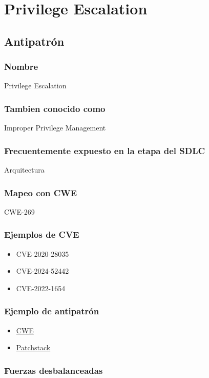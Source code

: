 \chapter{Privilege Escalation}
\section{Antipatrón}
\subsection{Nombre}
Privilege Escalation
\subsection{Tambien conocido como}
Improper Privilege Management
\subsection{Frecuentemente expuesto en la etapa del SDLC}
Arquitectura
\subsection{Mapeo con CWE}
CWE-269
\subsection{Ejemplos de CVE}
\begin{itemize}
    \item CVE-2020-28035
    \item CVE-2024-52442
    \item CVE-2022-1654
\end{itemize}
\subsection{Ejemplo de antipatrón}

\begin{itemize}
    \item \href{https://cwe.mitre.org/data/definitions/269.html}{CWE}
    \item \href{https://patchstack.com/academy/wordpress/vulnerabilities/privilege-escalation/}{Patchstack}
\end{itemize}

\subsection{Fuerzas desbalanceadas}

